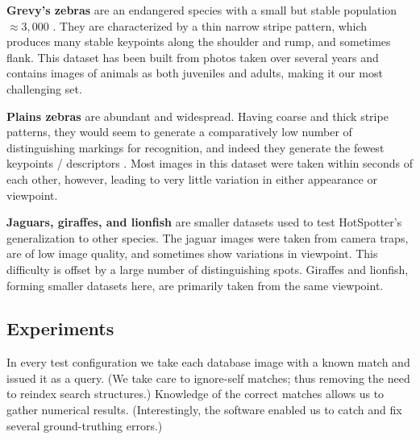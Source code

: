  \textbf{Grevy's zebras} %
are an endangered species with a small but stable population $\approx3,000$ \cite{williams2002status}.
They are characterized by a thin narrow stripe pattern, which produces many stable keypoints
along the shoulder and rump, and sometimes flank.
This dataset has been built from photos taken over several years and
contains images of animals as both juveniles and adults, making it our
most challenging set.

 \textbf{Plains zebras} %
 are abundant and widespread. Having
 coarse and thick stripe patterns, they would seem to generate a
 comparatively low number of distinguishing markings for recognition,
 and indeed they generate the fewest keypoints / descriptors .
Most images in this dataset were taken within seconds of each other, however,
leading to very little variation in either appearance or viewpoint.

 \textbf{Jaguars, giraffes, and lionfish} %
  are smaller datasets used to
  test HotSpotter's generalization to other species.  The jaguar images were
  taken from camera traps, are of low image quality, and sometimes
  show variations in viewpoint.  This difficulty is offset by a large
  number of distinguishing spots.  Giraffes and lionfish, forming smaller
  datasets here, are primarily taken from the same viewpoint.

\subsection{Experiments}

In every test configuration we take each database image with a known match and issued it as a query.
(We take care to ignore-self matches; thus removing the need to
reindex search structures.)  Knowledge of the correct matches allows us
to gather numerical results. (Interestingly, the software enabled us to catch and fix several ground-truthing errors.)


